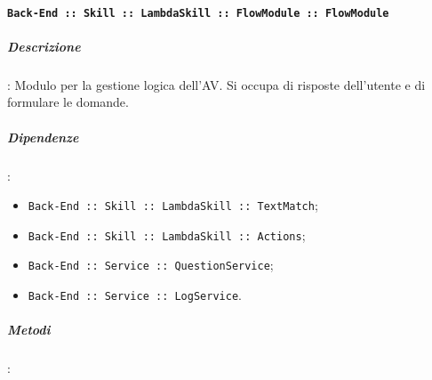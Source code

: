 \documentclass[../DefinizioneDiProdotto_v3.0.0.tex]{subfiles}
\begin{document}
\paragraph{\texttt{Back-End :: Skill :: LambdaSkill :: FlowModule :: FlowModule}}
\subparagraph{Descrizione}: Modulo per la gestione logica dell'AV. Si occupa di risposte dell'utente e di formulare le domande.
\subparagraph{Dipendenze}:
\begin{itemize}
	\item \texttt{Back-End :: Skill :: LambdaSkill :: TextMatch};
	\item \texttt{Back-End :: Skill :: LambdaSkill :: Actions};
	\item \texttt{Back-End :: Service :: QuestionService};
	\item \texttt{Back-End :: Service :: LogService}.
\end{itemize}
\subparagraph{Metodi}:
\end{document}
